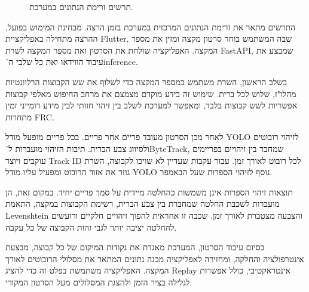 \begin{figure}[H]
  \caption{תרשים זרימת הנתונים במערכת.}
  \label{fig:system_pipeline}
\end{figure}

התרשים מתאר את זרימת הנתונים המרכזית במערכת בזמן הרצה. מבחינת המימוש
בפועל, ההרצה מתחילה באפליקציית \textenglish{Flutter}, שבה המשתמש בוחר
סרטון מקצה ומזין את מספר המקצה. האפליקציה שולחת את הסרטון ואת מספר
המקצה לשרת \textenglish{FastAPI}, שמבצע את עיבוד הווידאו ואת כל שלבי
ה־\textenglish{inference}.

בשלב הראשון, השרת משתמש במספר המקצה כדי לשלוף את שש הקבוצות הרלוונטיות
מהלו"ז, שלוש לכל ברית. שימוש זה בידע מוקדם מצמצם את מרחב החיפוש מאלפי
קבוצות אפשריות לשש קבוצות בלבד, ומאפשר למערכת לשלב בין זיהוי חזותי
לבין מידע דומייני זמין מתחרות \textenglish{FRC}.

לאחר מכן הסרטון מעובד פריים אחר פריים. בכל פריים מופעל מודל
\textenglish{YOLO} לזיהוי רובוטים ולסיווג צבע הברית. תיבות הזיהוי
מועברות ל־\textenglish{ByteTrack}, שמחבר בין זיהויים בפריימים עוקבים
ויוצר \textenglish{Track ID} לכל רובוט לאורך זמן. עבור עקבות שעדיין
לא שויכו לקבוצה, השרת גוזר את אזור הרובוט ומפעיל עליו מודל
\textenglish{YOLO} נוסף לזיהוי הספרות שעל הבאמפר.

תוצאות זיהוי הספרות אינן משמשות כהחלטה מיידית על סמך פריים יחיד.
במקום זאת, הן מועברות לשכבת החלטה שמחברת בין צבע הברית, רשימת הקבוצות
במקצה, התאמת \textenglish{Levenshtein} והצבעה מצטברת לאורך זמן. שכבה
זו אחראית להפוך זיהויים חלקיים ורועשים להחלטה יציבה יותר לגבי זהות
הקבוצה של כל עקבה.

בסיום עיבוד הסרטון, המערכת מאגדת את נקודות המיקום של כל קבוצה, מבצעת
אינטרפולציה והחלקה, ומחזירה לאפליקציה מבנה נתונים המתאר את מסלולי
הרובוטים לאורך המקצה. האפליקציה משתמשת בפלט זה כדי להציג
\textenglish{Replay} אינטראקטיבי, כולל אפשרות לגלילה בציר הזמן ולהצגת
המסלולים מעל הסרטון המקורי.

